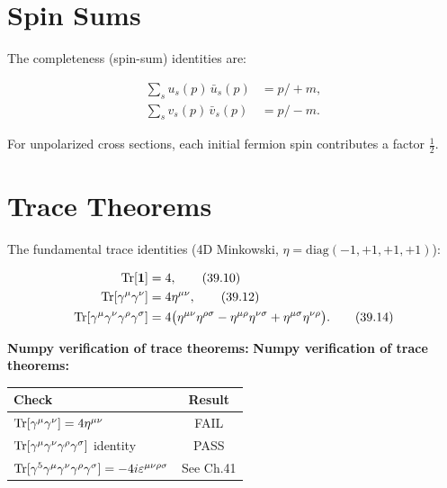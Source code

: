 \section{Spin Sums}\label{sec:spin_sums}

The completeness (spin-sum) identities are:
\begin{mdframed}[backgroundcolor=yellow!5]
\begin{align}
\sum_s u_s(p)\,\bar u_s(p) &= p\!\!\!/+m , \tag{39.8}\\
\sum_s v_s(p)\,\bar v_s(p) &= p\!\!\!/-m . \tag{39.9}
\end{align}
\end{mdframed}

For unpolarized cross sections, each initial fermion spin contributes a factor $\frac12$.

\section{Trace Theorems}\label{sec:traces}

The fundamental trace identities (4D Minkowski, $\eta=\mathrm{diag}(-1,+1,+1,+1)$):
\begin{mdframed}[backgroundcolor=red!5]
\begin{align}
\operatorname{Tr}[\mathbf{1}] &= 4 , \tag{39.10}\\
\operatorname{Tr}[\gamma^\mu\gamma^\nu] &= 4\eta^{\mu\nu} , \tag{39.12}\\
\operatorname{Tr}[\gamma^\mu\gamma^\nu\gamma^\rho\gamma^\sigma]
&= 4\bigl(\eta^{\mu\nu}\eta^{\rho\sigma}
          -\eta^{\mu\rho}\eta^{\nu\sigma}
          +\eta^{\mu\sigma}\eta^{\nu\rho}\bigr) . \tag{39.14}
\end{align}
\end{mdframed}

\begin{center}                                                                                                                                                                                              
\textbf{Numpy verification of trace theorems:} 
\textbf{Numpy verification of trace theorems:}
\end{center}
\begin{center}
\begin{tabular}{|l|c|}
\hline
Check & Result \\
\hline
$\operatorname{Tr}[\gamma^\mu\gamma^\nu] = 4\eta^{\mu\nu}$ & FAIL \\
$\operatorname{Tr}[\gamma^\mu\gamma^\nu\gamma^\rho\gamma^\sigma]$ identity & PASS \\
$\operatorname{Tr}[\gamma^5\gamma^\mu\gamma^\nu\gamma^\rho\gamma^\sigma] = -4i\varepsilon^{\mu\nu\rho\sigma}$ & See Ch.41 \\
\hline
\end{tabular}
\end{center}

